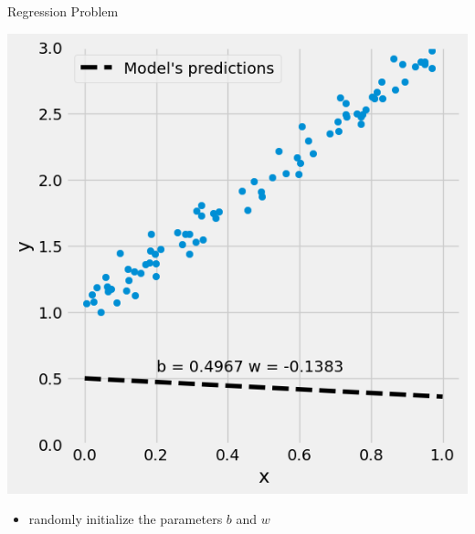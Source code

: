 \documentclass[pdflatex,compress,mathserif]{beamer}
\begin{document}
\begin{frame}{Regression Problem}
	\begin{multicols}{2}
		\begin{center}
			\includegraphics[width=\linewidth]{img/03}
		\end{center}
		\columnbreak
		\begin{itemize}
			\item randomly initialize the parameters $b$ and $w$
		\end{itemize}
	\end{multicols}
\end{frame}
\end{document}
